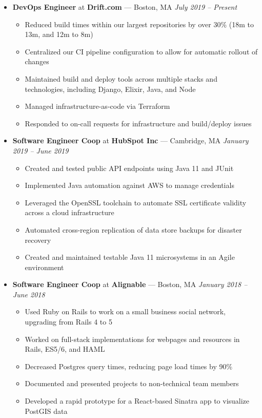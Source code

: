 \documentclass{article}
\begin{document}
\begin{itemize}[label={},leftmargin=*]
  \item \textbf{DevOps Engineer} at \textbf{Drift.com} --- Boston, MA \hfill {\em July 2019 -- Present}
  \begin{itemize}[label={$\bullet$}]
    \item Reduced build times within our largest repositories by over 30\% (18m to 13m, and 12m to 8m)
    \item Centralized our CI pipeline configuration to allow for automatic rollout of changes
    \item Maintained build and deploy tools across multiple stacks and technologies, including Django, Elixir, Java, and Node
    \item Managed infrastructure-as-code via Terraform
    \item Responded to on-call requests for infrastructure and build/deploy issues
  \end{itemize}

  \item \textbf{Software Engineer Coop} at \textbf{HubSpot Inc} --- Cambridge, MA \hfill {\em January 2019 -- June 2019}
  \begin{itemize}[label={$\bullet$}]
    \item Created and tested public API endpoints using Java 11 and JUnit
    \item Implemented Java automation against AWS to manage credentials
    \item Leveraged the OpenSSL toolchain to automate SSL certificate validity across a cloud infrastructure
    \item Automated cross-region replication of data store backups for disaster recovery
    \item Created and maintained testable Java 11 microsystems in an Agile environment
  \end{itemize}

  \item \textbf{Software Engineer Coop} at \textbf{Alignable} --- Boston, MA \hfill {\em January 2018 -- June 2018}
  \begin{itemize}[label={$\bullet$}]
    \item Used Ruby on Rails to work on a small business social network, upgrading from Rails 4 to 5
    \item Worked on full-stack implementations for webpages and resources in Rails, ES5/6, and HAML
    \item Decreased Postgres query times, reducing page load times by 90\%
    \item Documented and presented projects to non-technical team members
    \item Developed a rapid prototype for a React-based Sinatra app to visualize PostGIS data
  \end{itemize}


\end{itemize}
\end{document}
